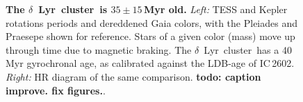\documentclass[12pt,modern,tighten]{aastex63}
\newcommand{\cn}{$\delta$~Lyr\ cluster} %
\begin{document}
\begin{figure}[t]
	\begin{center}
		\leavevmode
	\end{center}
	\vspace{-0.7cm}
	\caption{
    {\bf The \cn\ is $35\pm15$\,Myr old.} {\it Left:} TESS and Kepler
    rotations periods and dereddened Gaia colors, with the Pleiades
    \citep[125\,Myr;][]{rebull_rotation_2016a} and Praesepe
    \citep[650\,Myr;][]{douglas_poking_2017} shown for reference.
    Stars of a given color (mass) move up through time due to magnetic
    braking.  The \cn\ has a 40 Myr gyrochronal age, as calibrated
    against the LDB-age of IC\,2602.  {\it Right:} HR diagram of the
    same comparison. {\bf todo: caption improve. fix figures.}.
   \label{fig:age}
	}
\end{figure}
\end{document}
